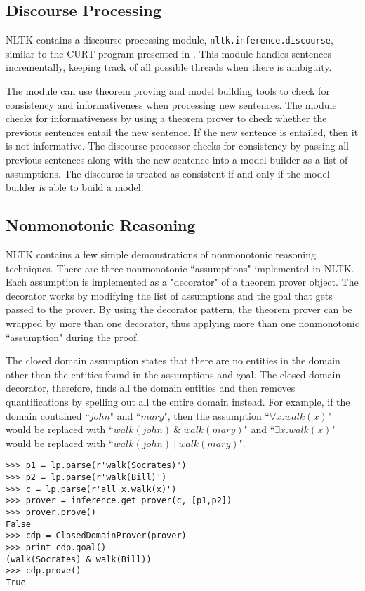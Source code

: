 \documentclass[11pt]{article}
\newcommand{\dhgcode}[1]{{\tt #1}}
\begin{document}
\subsection{Discourse Processing}
NLTK contains a discourse processing module, \dhgcode{nltk.inference.discourse}, similar to the CURT program presented in \cite{BB}.  This module handles sentences incrementally, keeping track of all possible threads when there is ambiguity.  

The module can use theorem proving and model building tools to check for consistency and informativeness when processing new sentences.  The module checks for informativeness by using a theorem prover to check whether the previous sentences entail the new sentence.  If the new sentence is entailed, then it is not informative.  The discourse processor checks for consistency by passing all previous sentences along with the new sentence into a model builder as a list of assumptions.  The discourse is treated as consistent if and only if the model builder is able to build a model.

\subsection{Nonmonotonic Reasoning}
NLTK contains a few simple demonstrations of nonmonotonic reasoning techniques.  There are three nonmonotonic ``assumptions" implemented in NLTK.  Each assumption is implemented as a "decorator" of a theorem prover object.  The decorator works by modifying the list of assumptions and the goal that gets passed to the prover.  By using the decorator pattern, the theorem prover can be wrapped by more than one decorator, thus applying more than one nonmonotonic ``assumption" during the proof.

The closed domain assumption states that there are no entities in the domain other than the entities found in the assumptions and goal.  The closed domain decorator, therefore, finds all the domain entities and then removes quantifications by spelling out all the entire domain instead.  For example, if the domain contained ``$john$" and ``$mary$", then the assumption ``$\forall x.walk(x)$" would be replaced with ``$walk(john)~\&~walk(mary)$" and ``$\exists x.walk(x)$" would be replaced with ``$walk(john)~|~walk(mary)$".

\begin{verbatim}
>>> p1 = lp.parse(r'walk(Socrates)')
>>> p2 = lp.parse(r'walk(Bill)')
>>> c = lp.parse(r'all x.walk(x)')
>>> prover = inference.get_prover(c, [p1,p2])
>>> prover.prove()
False
>>> cdp = ClosedDomainProver(prover)
>>> print cdp.goal()
(walk(Socrates) & walk(Bill))
>>> cdp.prove()
True
\end{verbatim}
\end{document}
